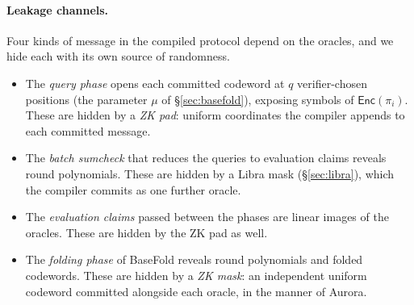 \documentclass{article}
\theoremstyle{definition}
\begin{document}
\paragraph{Leakage channels.}
Four kinds of message in the compiled protocol depend on the oracles, and we hide each with its own source of randomness.
\begin{itemize}
\item The \emph{query phase} opens each committed codeword at $q$ verifier-chosen positions (the parameter $\mu$ of \S\ref{sec:basefold}), exposing symbols of $\textsf{Enc}(\pi_i)$. These are hidden by a \emph{ZK pad}: uniform coordinates the compiler appends to each committed message.
\item The \emph{batch sumcheck} that reduces the queries to evaluation claims reveals round polynomials. These are hidden by a Libra mask (\S\ref{sec:libra}), which the compiler commits as one further oracle.
\item The \emph{evaluation claims} passed between the phases are linear images of the oracles. These are hidden by the ZK pad as well.
\item The \emph{folding phase} of BaseFold reveals round polynomials and folded codewords. These are hidden by a \emph{ZK mask}: an independent uniform codeword committed alongside each oracle, in the manner of Aurora.
\end{itemize}
\end{document}
